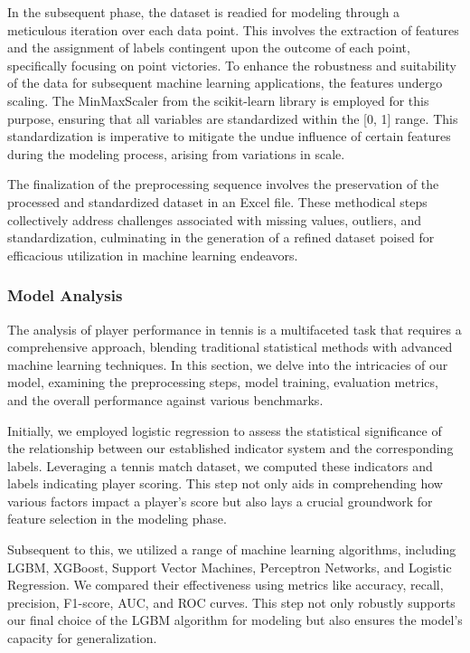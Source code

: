 \documentclass{article}
\begin{document}
In the subsequent phase, the dataset is readied for modeling through a meticulous iteration over each data point. This involves the extraction of features and the assignment of labels contingent upon the outcome of each point, specifically focusing on point victories. To enhance the robustness and suitability of the data for subsequent machine learning applications, the features undergo scaling. The MinMaxScaler from the scikit-learn library is employed for this purpose, ensuring that all variables are standardized within the [0, 1] range. This standardization is imperative to mitigate the undue influence of certain features during the modeling process, arising from variations in scale.

The finalization of the preprocessing sequence involves the preservation of the processed and standardized dataset in an Excel file. These methodical steps collectively address challenges associated with missing values, outliers, and standardization, culminating in the generation of a refined dataset poised for efficacious utilization in machine learning endeavors.
\subsubsection{Model Analysis}
The analysis of player performance in tennis is a multifaceted task that requires a comprehensive approach, blending traditional statistical methods with advanced machine learning techniques. In this section, we delve into the intricacies of our model, examining the preprocessing steps, model training, evaluation metrics, and the overall performance against various benchmarks.

Initially, we employed logistic regression to assess the statistical significance of the relationship between our established indicator system and the corresponding labels. Leveraging a tennis match dataset, we computed these indicators and labels indicating player scoring. This step not only aids in comprehending how various factors impact a player's score but also lays a crucial groundwork for feature selection in the modeling phase.

Subsequent to this, we utilized a range of machine learning algorithms, including LGBM, XGBoost, Support Vector Machines, Perceptron Networks, and Logistic Regression. We compared their effectiveness using metrics like accuracy, recall, precision, F1-score, AUC, and ROC curves. This step not only robustly supports our final choice of the LGBM algorithm for modeling but also ensures the model's capacity for generalization.
\end{document}
